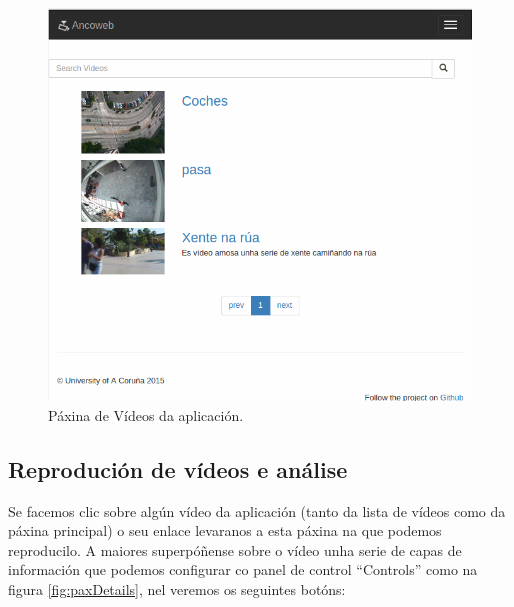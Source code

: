 \documentclass[11pt, a4paper, twoside, titlepage]{book}
\begin{document}
        \begin{figure}[htp]
        \begin{center}
            \includegraphics[scale=0.6]{figures/paxVideos.png}
            \caption{Páxina de Vídeos da aplicación.}
        \label{fig:paxVideos}
        \end{center}
        \end{figure}

    \subsection{Reprodución de vídeos e análise}
    
    Se facemos clic sobre algún vídeo da aplicación (tanto da lista de vídeos como da páxina 
    principal) o seu enlace levaranos a esta páxina na que podemos reproducilo. A maiores 
    superpóñense sobre o vídeo unha serie de capas de información que podemos configurar co panel de
    control ``Controls'' como na figura \ref{fig:paxDetails}, nel veremos os seguintes botóns:
    
\end{document}
